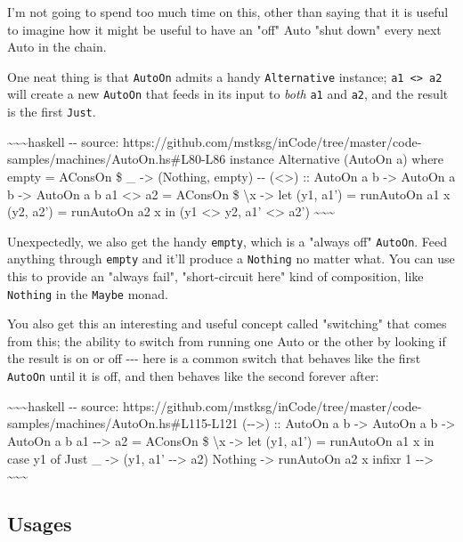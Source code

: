 \documentclass[]{article}
\begin{document}
I'm not going to spend too much time on this, other than saying that it is
useful to imagine how it might be useful to have an "off" Auto "shut down" every
next Auto in the chain.

One neat thing is that \texttt{AutoOn} admits a handy \texttt{Alternative}
instance; \texttt{a1\ \textless{}\textbar{}\textgreater{}\ a2} will create a new
\texttt{AutoOn} that feeds in its input to \emph{both} \texttt{a1} and
\texttt{a2}, and the result is the first \texttt{Just}.

\textasciitilde{}\textasciitilde{}\textasciitilde{}haskell -\/- source:
https://github.com/mstksg/inCode/tree/master/code-samples/machines/AutoOn.hs\#L80-L86
instance Alternative (AutoOn a) where empty = AConsOn \$ \_ -\textgreater{}
(Nothing, empty) -\/- (\textless{}\textbar{}\textgreater{}) :: AutoOn a b
-\textgreater{} AutoOn a b -\textgreater{} AutoOn a b a1
\textless{}\textbar{}\textgreater{} a2 = AConsOn \$ \textbackslash{}x
-\textgreater{} let (y1, a1') = runAutoOn a1 x (y2, a2') = runAutoOn a2 x in (y1
\textless{}\textbar{}\textgreater{} y2, a1' \textless{}\textbar{}\textgreater{}
a2') \textasciitilde{}\textasciitilde{}\textasciitilde{}

Unexpectedly, we also get the handy \texttt{empty}, which is a "always off"
\texttt{AutoOn}. Feed anything through \texttt{empty} and it'll produce a
\texttt{Nothing} no matter what. You can use this to provide an "always fail",
"short-circuit here" kind of composition, like \texttt{Nothing} in the
\texttt{Maybe} monad.

You also get this an interesting and useful concept called "switching" that
comes from this; the ability to switch from running one Auto or the other by
looking if the result is on or off -\/-\/- here is a common switch that behaves
like the first \texttt{AutoOn} until it is off, and then behaves like the second
forever after:

\textasciitilde{}\textasciitilde{}\textasciitilde{}haskell -\/- source:
https://github.com/mstksg/inCode/tree/master/code-samples/machines/AutoOn.hs\#L115-L121
(-\/-\textgreater{}) :: AutoOn a b -\textgreater{} AutoOn a b -\textgreater{}
AutoOn a b a1 -\/-\textgreater{} a2 = AConsOn \$ \textbackslash{}x
-\textgreater{} let (y1, a1') = runAutoOn a1 x in case y1 of Just \_
-\textgreater{} (y1, a1' -\/-\textgreater{} a2) Nothing -\textgreater{}
runAutoOn a2 x infixr 1 -\/-\textgreater{}
\textasciitilde{}\textasciitilde{}\textasciitilde{}

\subsection{Usages}
\end{document}
